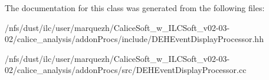 The documentation for this class was generated from the following files\-:\begin{DoxyCompactItemize}
\item 
/nfs/dust/ilc/user/marquezh/\-Calice\-Soft\-\_\-w\-\_\-\-I\-L\-C\-Soft\-\_\-v02-\/03-\/02/calice\-\_\-analysis/addon\-Procs/include/D\-E\-H\-Event\-Display\-Processor.\-hh\item 
/nfs/dust/ilc/user/marquezh/\-Calice\-Soft\-\_\-w\-\_\-\-I\-L\-C\-Soft\-\_\-v02-\/03-\/02/calice\-\_\-analysis/addon\-Procs/src/D\-E\-H\-Event\-Display\-Processor.\-cc\end{DoxyCompactItemize}

